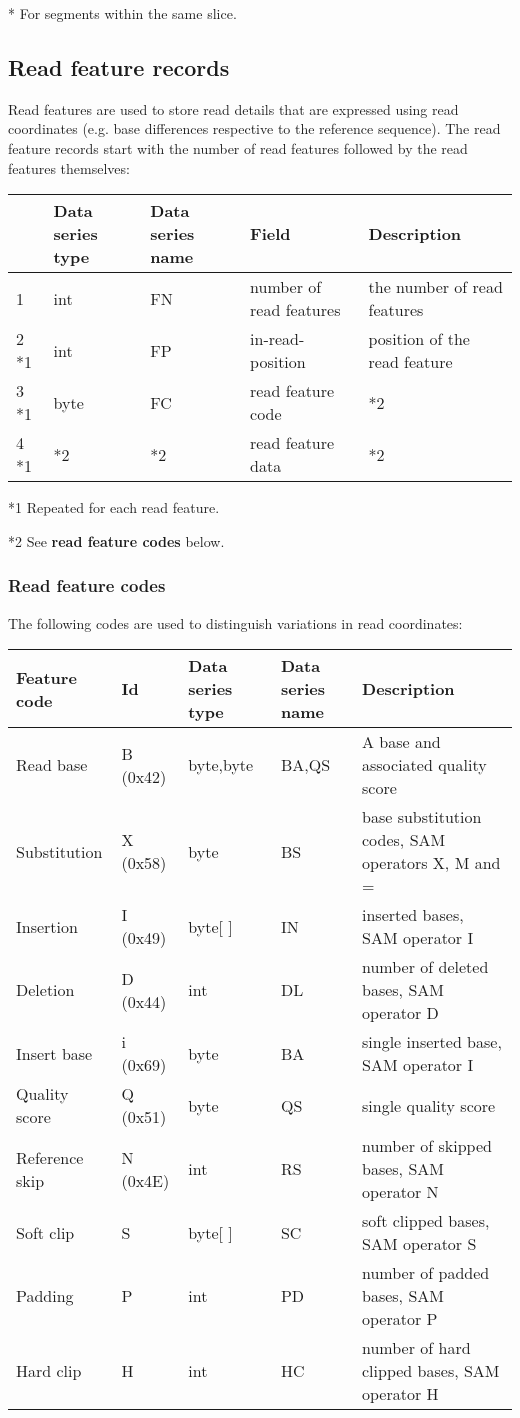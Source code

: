 \documentclass[a4paper]{article}
\begin{document}
* For segments within the same slice.

\subsection{\textbf{Read feature records}}

Read features are used to store read details that are expressed using read coordinates 
(e.g. base differences respective to the reference sequence). The read feature 
records start with the number of read features followed by the read features themselves:

\begin{tabular}{|>{\raggedright}p{36pt}|>{\raggedright}p{65pt}|>{\raggedright}p{84pt}|>{\raggedright}p{90pt}|>{\raggedright}p{168pt}|}
\hline
 & \textbf{Data series type} & \textbf{Data series name} & \textbf{Field} & \textbf{Description}\tabularnewline
\hline
1 & int & FN & number of read features & the number of read features\tabularnewline
\hline
2 *1 & int & FP & in-read-position & position of the read feature\tabularnewline
\hline
3 *1 & byte & FC & read feature code & *2\tabularnewline
\hline
4 *1 & *2 & *2 & read feature data & *2\tabularnewline
\hline
\end{tabular}

*1 Repeated for each read feature.

*2 See \textbf{read feature codes} below.

\subsubsection*{Read feature codes}

The following codes are used to distinguish variations in read coordinates:

\begin{tabular}{|>{\raggedright}p{91pt}|>{\raggedright}p{45pt}|>{\raggedright}p{72pt}|>{\raggedright}p{66pt}|>{\raggedright}p{132pt}|}
\hline
\textbf{Feature code} & \textbf{Id} & \textbf{Data series type} & \textbf{Data 
series name} & \textbf{Description}\tabularnewline
\hline
Read base & B (0x42) & byte,byte & BA,QS & A base and associated quality score\tabularnewline
\hline
Substitution & X (0x58) & byte & BS & base substitution codes, SAM operators X, 
M and =\tabularnewline
\hline
Insertion & I (0x49) & byte[ ] & IN & inserted bases, SAM operator I\tabularnewline
\hline
Deletion & D (0x44) & int & DL & number of deleted bases, SAM operator D\tabularnewline
\hline
Insert base & i (0x69) & byte & BA & single inserted base, SAM operator I\tabularnewline
\hline
Quality score & Q (0x51) & byte & QS & single quality score\tabularnewline
\hline
Reference skip & N (0x4E) & int & RS & number of skipped bases, SAM operator N\tabularnewline
\hline
Soft clip & S & byte[ ] & SC & soft clipped bases, SAM operator S\tabularnewline
\hline
Padding & P & int & PD & number of padded bases, SAM operator P\tabularnewline
\hline
Hard clip & H & int & HC & number of hard clipped bases, SAM operator H\tabularnewline
\hline
\end{tabular}
\end{document}
